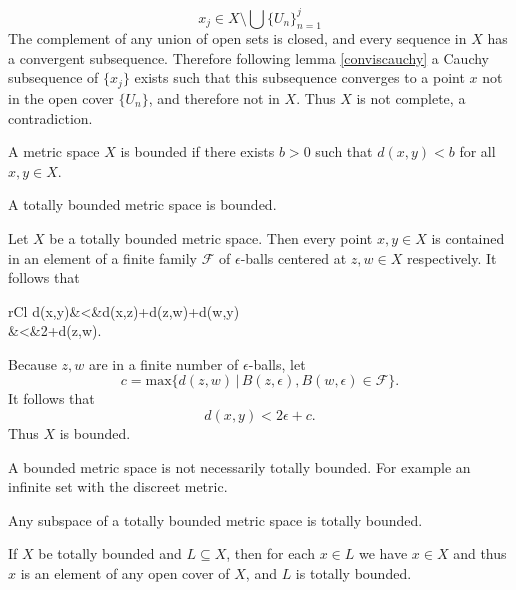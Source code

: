 \documentclass[nobib,notoc]{tufte-handout}
\begin{document}
\begin{thm}
\begin{IEEEproof}
		\begin{equation*}
			x_j\in X\setminus\bigcup\{U_n\}_{n=1}^{j}
		\end{equation*}
		The complement of any union of open sets is closed, and every sequence in \(X\) has a convergent subsequence. Therefore following lemma \ref{conviscauchy} a Cauchy subsequence of \(\{x_j\}\) exists such that this subsequence converges to a point \(x\) not in the open cover \(\{U_n\}\), and therefore not in \(X\). Thus \(X\) is not complete, a contradiction.
	\end{IEEEproof}
\end{thm}
\begin{defi}[Bounded]
	A metric space \(X\) is bounded if there exists \(b>0\) such that \(d(x,y)<b\) for all \(x,y\in X\).
\end{defi}
\begin{lem}
	A totally bounded metric space is bounded.
	\begin{IEEEproof}
		Let \(X\) be a totally bounded metric space. Then every point \(x,y\in X\) is contained in an element of a finite family \(\mathscr{F}\) of \(\epsilon\)-balls centered at \(z,w\in X\) respectively. It follows that
		\begin{IEEEeqnarray*}{rCl}
			d(x,y)&<&d(x,z)+d(z,w)+d(w,y)\\
			&<&2\epsilon+d(z,w).
		\end{IEEEeqnarray*}
		Because \(z,w\) are in a finite number of \(\epsilon\)-balls, let
		\begin{equation*}
		c=\text{max}\{d(z,w)\,|\,B(z,\epsilon),B(w,\epsilon)\in\mathscr{F}\}.
		\end{equation*}
		It follows that
		\begin{equation*}
			d(x,y)<2\epsilon+c.
		\end{equation*}
		Thus \(X\) is bounded.
	\end{IEEEproof}
\end{lem}
\begin{rema}
	A bounded metric space is not necessarily totally bounded. For example an infinite set with the discreet metric.
\end{rema}
\begin{lem}
	Any subspace of a totally bounded metric space is totally bounded.
	\begin{IEEEproof}
		If \(X\) be totally bounded and \(L\subseteq X\), then for each \(x\in L\) we have \(x\in X\) and thus \(x\) is an element of any open cover of \(X\), and \(L\) is totally bounded.
	\end{IEEEproof}
\end{lem}
\end{document}
